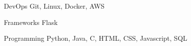 

\begin{cvskills}


  \cvskill
    {DevOps} %
    {Git, Linux, Docker, AWS} %

  \cvskill
    {Frameworks} %
    {Flask} %

  \cvskill
    {Programming} %
    {Python, Java, C, HTML, CSS, Javascript, SQL} %


\end{cvskills}
